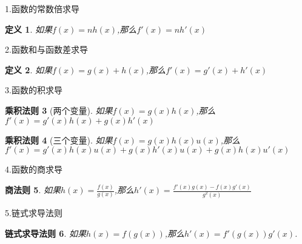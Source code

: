 \documentclass[UTF8,fontset=ubuntu]{ctexart}
\begin{document}
	\parindent=0pt
	\newtheorem{definition}{定义}
	1.函数的常数倍求导\par
	\begin{definition}
			如果$f(x)=nh(x)$,那么$f'(x)=nh'(x)$
	\end{definition}
	2.函数和与函数差求导\par
	\begin{definition}
			如果$f(x)=g(x)+h(x)$,那么$f'(x)=g'(x)+h'(x)$
	\end{definition}
	3.函数的积求导\par
	\newtheorem*{multiple}[definition]{乘积法则}
	\begin{multiple}[两个变量]
			如果$f(x)=g(x)h(x)$,那么$f'(x)=g'(x)h(x)+g(x)h'(x)$
	\end{multiple}
	\begin{multiple}[三个变量]
			如果$f(x)=g(x)h(x)u(x)$,那么$f'(x)=g'(x)h(x)u(x)+g(x)h'(x)u(x)+g(x)h(x)u'(x)$
	\end{multiple}
	4.函数的商求导\par
	\newtheorem*{divide_theory}[definition]{商法则}
	\begin{divide_theory}
		如果$h(x)=\frac{f(x)}{g(x)}$,那么$h'(x)=\frac{f'(x)g(x)-f(x)g'(x)}{g^2(x)}$
	\end{divide_theory}
	5.链式求导法则\par
	\newtheorem*{chain}[definition]{链式求导法则}
	\begin{chain}
		如果$h(x)=f(g(x))$,那么$h'(x)=f'(g(x))g'(x)$.
	\end{chain}
\end{document}
